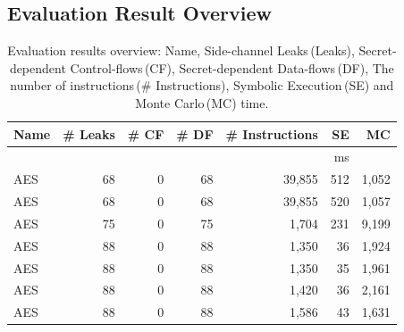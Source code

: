 \subsection{Evaluation Result Overview}
\begin{table}[]
  \centering\small\footnotesize
  \caption{Evaluation results overview: Name, Side-channel Leaks\,(Leaks), 
      Secret-dependent Control-flows\,(CF), Secret-dependent Data-flows\,(DF),
      The number of instructions\,(\# Instructions), Symbolic Execution\,(SE) and Monte Carlo\,(MC) time.
  }\label{table:over_result}
  \newlength{\x}
  \newlength{\y}
  \settowidth{\x}{~~}
  \settowidth{\y}{m}
  \addtolength{\x}{-1\y}
  \newcommand{\foo}{\mbox{\hspace*{\the\x}}}
  \begin{threeparttable}
  \begin{tabular}{l@{}r@{~~}rrr@{~~}rr}
      \hline
      \textbf{Name}   & \textbf{\# Leaks} & \textbf{\# CF}         & \textbf{\# DF}
                         & \textbf{\# Instructions}    & \textbf{SE} & \textbf{MC}                                                    \\\hline
                                               &                        &                     &                      &              & ms                     \\
      AES\tnote{1}               & 68                     & 0                   & 68                   & 39,855        & 512     & 1,052         \\
      AES\tnote{2}                & 68                     & 0                   & 68                   & 39,855       & 520    & 1,057         \\
      AES\tnote{4}                & 75                     & 0                   & 75                   & 1,704        & 231    & 9,199        \\
      AES\tnote{5}                & 88                     & 0                   & 88                   & 1,350        & 36      & 1,924         \\
      AES\tnote{6}                & 88                     & 0                   & 88                   & 1,350        & 35      & 1,961        \\
      AES\tnote{7}                & 88                     & 0                   & 88                   & 1,420        & 36     & 2,161        \\
      AES\tnote{8}                & 88                     & 0                   & 88                   & 1,586        & 43      & 1,631        \\

\end{tabular}
\end{threeparttable}
\end{table}
